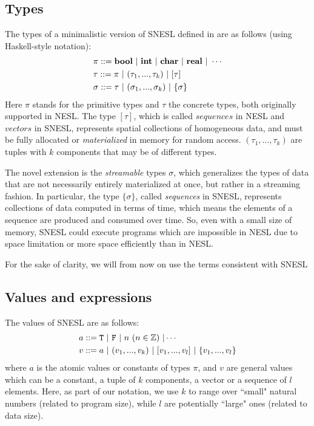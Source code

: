 \subsection{Types}

The types of a minimalistic version of SNESL defined in \cite{MadFil13} are as follows (using Haskell-style notation):
\begin{align*} 
& \pi ::= \bool \ | \ \int \ | \ \*{char} \ | \ \*{real}  \ | \ \cdots \\
& \tau ::= \pi \ | \ (\tau_1,...,\tau_k) \ | \ [\tau]  \\
& \sigma ::= \tau \ | \ (\sigma_1,...,\sigma_k) \ | \ \tseq{\sigma}  
\end{align*}
Here $\pi$ stands for the primitive types and $\tau$ the concrete types, both originally supported in NESL.
The type $[\tau]$, which is called $sequences$ in NESL and $vectors$ in SNESL, represents spatial collections of homogeneous data, and must be
fully allocated or \emph{materialized} in memory for random access.  
$(\tau_1,...,\tau_k)$ are tuples with $k$ components that may be of different types.

The novel extension is the \emph{streamable} types $\sigma$, which generalizes the types of data that are not necessarily entirely materialized at once, but rather in a streaming fashion. 
In particular, the type $\{\sigma\}$, called \emph{sequences} in SNESL, represents collections of data computed in terms of time, which means the elements of a sequence are produced and consumed over time.
So, even with a small size of memory, SNESL could execute programs which are impossible in NESL due to space limitation or more space efficiently than in NESL. 

For the sake of clarity, we will from now on use the terms consistent with SNESL
\subsection{Values and expressions}

The values of SNESL are as follows:
\begin{align*}
& a ::=  \T \ | \ \F \ | \ n \ (n \in \mathbb{Z}) \ | \cdots\\
& v ::=  a \ | \ (v_1,...,v_k) \ | \ [v_1,...,v_l] \ | \ \{v_1,...,v_l\} 
\end{align*}
where $a$ is the atomic values or constants of types $\pi$, and $v$ are
 general values which can be a constant, a tuple of $k$ components, a vector or a sequence of $l$ elements. 
Here, as part of our notation, we use $k$ to range over ``small" natural numbers (related to program size), while $l$ are potentially ``large" ones (related to data size). 

